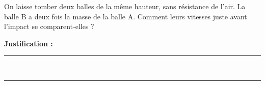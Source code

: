 On laisse tomber deux balles de la même hauteur, sans résistance de l'air. La balle B a deux fois la masse de la balle A. Comment leurs vitesses juste avant l'impact se comparent-elles ?

\choices

\noindent\textbf{Justification :} \hrulefill \\[2.5ex]
\rule{\linewidth}{0.4pt} \\[2.5ex]
\rule{\linewidth}{0.4pt}
\vfill

